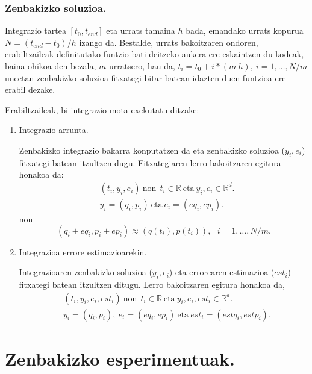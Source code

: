 \subsubsection*{Zenbakizko soluzioa.}  

Integrazio tartea $[t_0,t_{end}]$ eta urrats tamaina $h$ bada, emandako urrats kopurua $N=(t_{end}-t_0)/h$ izango da. Bestalde, urrats bakoitzaren ondoren, erabiltzaileak definitutako funtzio bati deitzeko aukera ere eskaintzen du kodeak, baina ohikoa den bezala, $m$ urratsero, hau da, $t_i=t_0+i*(m \ h), \ i=1,\dots,N/m$ uneetan zenbakizko soluzioa fitxategi bitar batean idazten duen funtzioa ere erabil dezake.

Erabiltzaileak, bi integrazio mota exekutatu ditzake:
\begin{enumerate}
\item Integrazio arrunta.

Zenbakizko integrazio bakarra konputatzen da eta zenbakizko soluzioa ($y_i,e_i$) fitxategi batean itzultzen dugu. Fitxategiaren lerro bakoitzaren egitura honakoa da:
\begin{align*}
& (t_i,y_i,e_i) \ \text{non} \ \ t_i \in \mathbb{R} \ \text{eta} \ y_i,e_i \in \mathbb{R}^d.\\
& y_i=(q_i,p_i) \ \text{eta} \ e_i=(eq_i,ep_i).
\end{align*}
non
\begin{equation*}
(q_i+eq_i,p_i+ep_i)\approx(q(t_i),p(t_i)), \ \ \ i=1,\dots,N/m.
\end{equation*}

\item Integrazioa errore estimazioarekin.

Integrazioaren zenbakizko soluzioa ($y_i,e_i$) eta errorearen estimazioa ($est_i$)  fitxategi batean itzultzen ditugu. Lerro bakoitzaren egitura honakoa da,
\begin{align*}
& (t_i,y_i,e_i,est_i) \ \text{non} \ \ t_i \in \mathbb{R} \ \text{eta} \ y_i,e_i,est_i \in \mathbb{R}^d.\\
&  y_i=(q_i,p_i), \ e_i=(eq_i,ep_i) \ \text{eta} \ est_i=(estq_i,estp_i).
\end{align*}

\end{enumerate}


\clearpage


\section{Zenbakizko esperimentuak.}

